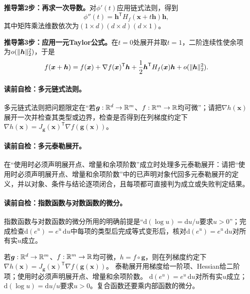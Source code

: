 \textbf{推导第2步：再求一次导数。}对$\phi'(t)$应用链式法则，得到
\[
\phi''(t)=\boldsymbol h^{\mathsf T}H_f(\boldsymbol x+t\boldsymbol h)\boldsymbol h,
\]
其中矩阵乘法维数依次为$(1\times d)(d\times d)(d\times1)$。

\textbf{推导第3步：应用一元Taylor公式。}在$t=0$处展开并取$t=1$，二阶连续性使余项为$o(\lVert\boldsymbol h\rVert_2^2)$，于是
\[
f(\boldsymbol{x}+\boldsymbol{h})=f(\boldsymbol{x})+
\nabla f(\boldsymbol{x})^{\mathsf T}\boldsymbol{h}
+\frac12\boldsymbol{h}^{\mathsf T}H_f(\boldsymbol{x})\boldsymbol{h}
+o(\lVert\boldsymbol h\rVert_2^2).
\]


\paragraph{读前自检：多元链式法则。}多元链式法则把问题限定在“若$\boldsymbol g:\mathbb{R}^d\to\mathbb{R}^m$、$f:\mathbb{R}^m\to\mathbb{R}$均可微”；请把$\nabla h(\boldsymbol x)$展开一次并检查其类型或边界，检查是否得到在列梯度约定下 $\nabla h(\boldsymbol x)=J_{\boldsymbol g}(\boldsymbol x)^{\mathsf T}\nabla f(\boldsymbol g(\boldsymbol x))$。\par
\paragraph{读前自检：多元泰勒展开。}在“使用时必须声明展开点、增量和余项阶数”成立时处理多元泰勒展开：请把“使用时必须声明展开点、增量和余项阶数”中的已声明对象代回多元泰勒展开的定义，并以对象、条件与结论逐项闭合，且每项都可直接判为成立或失败判定结果。\par
\paragraph{读前自检：指数函数与对数函数的微分。}指数函数与对数函数的微分所用的明确前提是“$\mathrm d(\log u)=\mathrm du/u$要求$u>0$”；完成检查$\mathrm d(e^u)=e^u\,\mathrm du$中每项的类型后完成等式变形后，核对$\mathrm d(e^u)=e^u\,\mathrm du$对所有实$u$成立。\par

若$\boldsymbol g:\mathbb{R}^d\to\mathbb{R}^m$、$f:\mathbb{R}^m\to\mathbb{R}$均可微，$h=f\circ\boldsymbol g$，则在列梯度约定下
$\nabla h(\boldsymbol x)=J_{\boldsymbol g}(\boldsymbol x)^{\mathsf T}\nabla f(\boldsymbol g(\boldsymbol x))$。
泰勒展开用梯度给一阶项、Hessian给二阶项；使用时必须声明展开点、增量和余项阶数。
$\mathrm d(e^u)=e^u\,\mathrm du$对所有实$u$成立；$\mathrm d(\log u)=\mathrm du/u$要求$u>0$。复合函数还要乘内部函数的微分。


